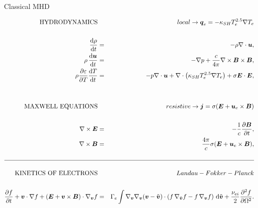 \documentclass[8pt, compress]{beamer}
\newcommand{\pdv}[2]{\frac{\partial{#1}}{\partial{#2}}}
\newcommand{\vect}[1]{\boldsymbol{#1}}
\newcommand{\dI}{\text{d}}
\newcommand{\nuei}{\nu_{ei}}
\newcommand{\E}{\vect{E}}
\newcommand{\B}{\vect{B}}
\newcommand{\Te}{T_e}
\newcommand{\vv}{\vect{v}}
\newcommand{\vvb}{\tilde{\vect{v}}}
\newcommand{\gv}{\nabla_{\vv}}
\newcommand{\gvb}{\nabla_{\vvb}}
\newcommand{\ft}{f}
\begin{document}
\begin{frame}
\begin{center}
{\huge Classical MHD}  

\begin{eqnarray}
  \text{HYDRODYNAMICS} && 
  local \rightarrow \vect{q}_e = - \kappa_{SH} \Te^{2.5} \nabla \Te \nonumber \\
  && \nonumber \\
  \frac{\dI \rho}{\dI t} &=& - \rho\nabla\cdot\vect{u} , 
  \nonumber\\ 
  \rho\, \frac{\dI \vect{u}}{\dI t} &=& - \nabla p 
  + \frac{c}{4\pi}\nabla\times\vect{B}\times \vect{B}, 
  \nonumber\\   
  \rho \frac{\partial \varepsilon}{\partial T}\frac{\dI T}{\dI t}
  &=& 
  - p \nabla\cdot\vect{u} 
  + \nabla\cdot\left(\kappa_{SH} \Te^{2.5} \nabla \Te \right) 
  + \sigma \E\cdot\E , 
  \nonumber \\
  && \nonumber \\
  && \nonumber \\
  \text{MAXWELL EQUATIONS} && 
  resistive\rightarrow\vect{j} = \sigma (\E + \vect{u}_e \times \B)\nonumber \\
  && \nonumber \\
  \nabla\times\vect{E} &=& -\frac{1}{c}\frac{\partial \vect{B}}{\partial t} ,
  \nonumber \\
  \nabla\times\vect{B} &=& \frac{4\pi}{c}
  \sigma (\E + \vect{u}_e \times \B) ,%
  \nonumber \\
  && \nonumber \\
  \hline \nonumber \\
  \text{KINETICS OF ELECTRONS} && Landau-Fokker-Planck \nonumber \\
  && \nonumber \\
  \pdv{f}{t} + \vect{v}\cdot\nabla f +
  \left( \vect{E} + \vect{v}\times\vect{B}\right)\cdot\nabla_{\vect{v}} f
  &=& 
  \Gamma_e \int \gv\gv(\vv - \vvb) \cdot \left(
  \ft\, \gvb \ft - \ft\, \gv \ft \right)\, \dI\vvb
  + \frac{\nuei}{2} \frac{\partial^2 f}{\partial \Omega^2} .
  \nonumber
\end{eqnarray}
\end{center}
\end{frame}
\end{document}
